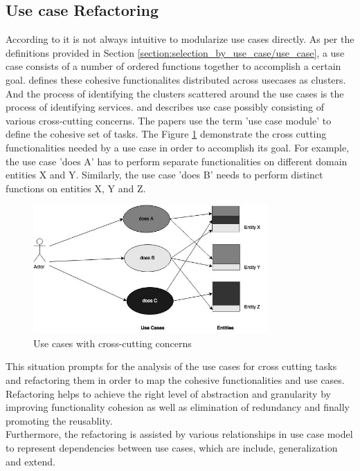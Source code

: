 \subsection{Use case Refactoring}\label{section:selection_by_use_case/use_case_refactoring}
According to \cite{Jacobson:1987aa} it is not always intuitive to modularize use cases directly. As per the definitions provided in Section \ref{section:selection_by_use_case/use_case}, a use case consists of a number of ordered functions together to accomplish a certain goal. \cite{Jacobson:1987aa} defines these cohesive functionalites distributed across usecases as clusters. And the process of identifying the clusters scattered around the use cases is the process of identifying services. \cite{Ng:2004aa} and \cite{Jacobson:2003aa} describes use case possibly consisting of various cross-cutting concerns. The papers use the term 'use case module' to define the cohesive set of tasks. The Figure \ref{fig:selection_by_use_case/use_case_one} demonstrate the cross cutting functionalities needed by a use case in order to accomplish its goal. For example, the use case 'does A' has to perform separate functionalities on different domain entities X and Y. Similarly, the use case 'does B' needs to perform distinct functions on entities X, Y and Z.
\begin{figure}[H]
\begin{center}
\includegraphics[width=0.8\textwidth]{figures/use-case-one}
\caption{Use cases with cross-cutting concerns \cite{Ng:2004aa}}
\label{fig:selection_by_use_case/use_case_one}
\end{center}
\end{figure}
This situation prompts for the analysis of the use cases for cross cutting tasks and refactoring them in order to map the cohesive functionalities and use cases. Refactoring helps to achieve the right level of abstraction and granularity by improving functionality cohesion as well as elimination of redundancy and finally promoting the reusablity. \cite{Doh:2007aa}
\\
Furthermore, the refactoring is assisted by various relationships in use case model to represent dependencies between use cases, which are include, generalization and extend. \cite{Ng:2004aa}
\\
